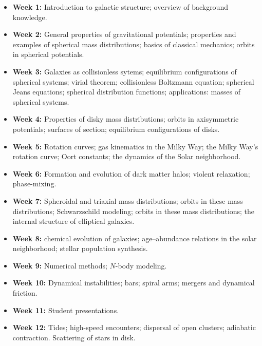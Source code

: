 \documentclass{article}
\begin{document}
\begin{itemize}

  \item {\bf Week 1:} Introduction to galactic structure; overview of
    background knowledge.

  \item {\bf Week 2:} General properties of gravitational potentials;
    properties and examples of spherical mass distributions; basics of
    classical mechanics; orbits in spherical potentials.

  \item {\bf Week 3:} Galaxies as collisionless sytems; equilibrium
    configurations of spherical systems; virial theorem; collisionless
    Boltzmann equation; spherical Jeans equations; spherical
    distribution functions; applications: masses of spherical systems.

  \item {\bf Week 4:} Properties of disky mass distributions; orbits
    in axisymmetric potentials; surfaces of section; equilibrium
    configurations of disks.

  \item {\bf Week 5:} Rotation curves; gas kinematics in the Milky
    Way; the Milky Way's rotation curve; Oort constants; the dynamics
    of the Solar neighborhood.

  \item {\bf Week 6:} Formation and evolution of dark matter halos;
    violent relaxation; phase-mixing.

  \item {\bf Week 7:} Spheroidal and triaxial mass distributions;
    orbits in these mass distributions; Schwarzschild modeling; orbits
    in these mass distributions; the internal structure of elliptical
    galaxies.

  \item {\bf Week 8:} chemical evolution of galaxies; age--abundance
    relations in the solar neighborhood; stellar population synthesis.

  \item {\bf Week 9:} Numerical methods; $N$-body modeling.

  \item {\bf Week 10:} Dynamical instabilities; bars; spiral arms;
    mergers and dynamical friction.

  \item {\bf Week 11:} Student presentations.

  \item {\bf Week 12:} Tides; high-speed encounters; dispersal of open
    clusters; adiabatic contraction. Scattering of stars in disk.

\end{itemize}
\end{document}

